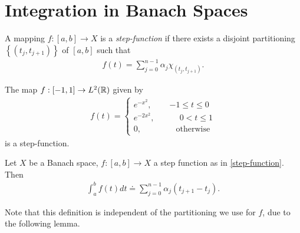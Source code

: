 \section{Integration in Banach Spaces}
\label{sec:int-banach}
%
%
%
%
%
%
%
%
%
%
%
%
%
%
%
%
\begin{definition}
	A mapping $f:[a,b] \to X$ is a \emph{step-function} if there exists a disjoint
	partitioning $\left\{ (t_{j}, t_{j+1}) \right\}$ of $[a,b]$ such that
	\begin{equation}
		\label{step-function}
		\begin{split}
			f(t)=\sum_{j=0}^{n-1} {\alpha_j} \chi_{(t_{j}, t_{j+1})}.
		\end{split}
	\end{equation}
\end{definition}
%
%
\begin{framed}
\begin{example}
	The map $f:[-1,1] \to L^2(\mathbb{R})$ given by 
	\begin{equation*}
		\begin{split}
			f(t) = 
			\begin{cases}
				 e^{-x^2},  \quad & -1 \le t\le0 \\
				 e^{-2x^2},  \quad & \phantom - 0 < t \le 1 \\
				 0,  \quad & \phantom - \text{otherwise}
			\end{cases}
		\end{split}
	\end{equation*}
	is a step-function.
	\end{example}
\end{framed}
%
%
\begin{definition}
	Let $X$ be a Banach space, $f: [a,b] \to
	X$ a step function as in \eqref{step-function}. 
	Then 
	\begin{equation*}
		\begin{split}
      \int_a^b f(t) dt \doteq \sum_{j=0}^{n-1} \alpha_j (t_{j+1} - t_{j}).
    \end{split}
	\end{equation*}
%
\end{definition}
%
%
Note that this definition is independent of the partitioning we use for $f$, due
to the following lemma.
